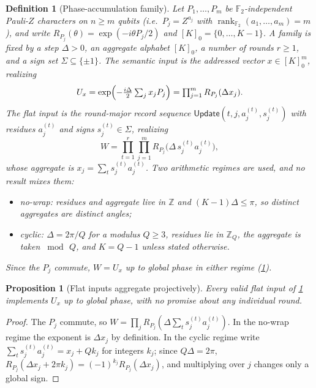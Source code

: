 \documentclass[aps,prx,reprint,floatfix,superscriptaddress]{revtex4-2}
\newtheorem{definition}{Definition}
\newtheorem{proposition}{Proposition}
\newcommand{\Ftwo}{\mathbb{F}_2}
\begin{document}
\begin{definition}[Phase-accumulation family]
\label{def:phase-family}
Let $P_1,\ldots,P_m$ be $\Ftwo$-independent Pauli-$Z$ characters on
$n\geq m$ qubits (i.e.\ $P_j=Z^{a_j}$ with
$\operatorname{rank}_{\Ftwo}(a_1,\ldots,a_m)=m$), and write
$R_{P_j}(\theta)=\exp(-i\theta P_j/2)$ and $[K]_0=\{0,\ldots,K-1\}$.  A
family is fixed by a step $\Delta>0$, an aggregate alphabet $[K]_0$, a
number of rounds $r\geq1$, and a sign set $\Sigma\subseteq\{\pm1\}$.  The
\emph{semantic input} is the addressed vector $x\in[K]_0^m$, realizing
\begin{equation}\label{eq:Ux-def}
 U_x=\exp\Bigl(-\tfrac{i\Delta}{2}\textstyle\sum_{j}x_jP_j\Bigr)
    =\prod_{j=1}^{m}R_{P_j}(\Delta x_j).
\end{equation}
The \emph{flat input} is the round-major record sequence
$\mathsf{Update}(t,j,a_j^{(t)},s_j^{(t)})$ with residues $a_j^{(t)}$ and
signs $s_j^{(t)}\in\Sigma$, realizing
\begin{equation}\label{eq:family-flat}
 W=\prod_{t=1}^{r}\prod_{j=1}^{m}R_{P_j}\bigl(\Delta\,s_j^{(t)}a_j^{(t)}\bigr),
\end{equation}
whose aggregate is $x_j=\sum_{t}s_j^{(t)}a_j^{(t)}$.  Two arithmetic
regimes are used, and no result mixes them:
\begin{itemize}[leftmargin=1.4em,topsep=2pt,itemsep=1pt]
\item \emph{no-wrap}: residues and aggregate live in $\mathbb Z$ and
$(K-1)\Delta\leq\pi$, so distinct aggregates are distinct angles;
\item \emph{cyclic}: $\Delta=2\pi/Q$ for a modulus $Q\geq3$, residues lie
in $\mathbb Z_Q$, the aggregate is taken $\bmod\,Q$, and $K=Q-1$ unless
stated otherwise.
\end{itemize}
Since the $P_j$ commute, $W=U_x$ up to global phase in either regime
(\cref{prop:family-aggregates}).
\end{definition}

\begin{proposition}[Flat inputs aggregate projectively]
\label{prop:family-aggregates}
Every valid flat input of \cref{def:phase-family} implements $U_x$ up to
global phase, with no promise about any individual round.
\end{proposition}

\begin{proof}
The $P_j$ commute, so $W=\prod_jR_{P_j}(\Delta\sum_ts_j^{(t)}a_j^{(t)})$.
In the no-wrap regime the exponent is $\Delta x_j$ by definition.  In the
cyclic regime write $\sum_ts_j^{(t)}a_j^{(t)}=x_j+Qk_j$ for integers
$k_j$; since $Q\Delta=2\pi$, $R_{P_j}(\Delta x_j+2\pi k_j)
=(-1)^{k_j}R_{P_j}(\Delta x_j)$, and multiplying over $j$ changes only a
global sign.
\end{proof}
\end{document}
